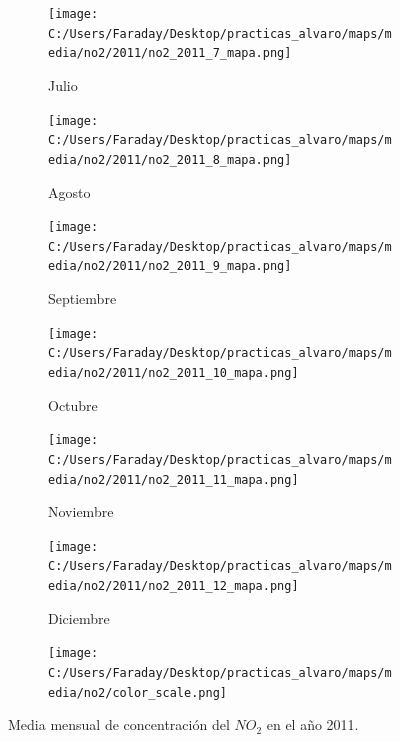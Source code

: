 \documentclass[12pt]{article}
\begin{document}
\begin{figure}[H]
\begin{subfigure}[H]{0.15\textwidth}
\texttt{[image: C:/Users/Faraday/Desktop/practicas\_alvaro/maps/media/no2/2011/no2\_2011\_7\_mapa.png]}
\captionsetup{labelformat=empty}
\caption{Julio}
\label{fig:map-no2-2011-7}
\end{subfigure}
%
\begin{subfigure}[H]{0.15\textwidth}
\texttt{[image: C:/Users/Faraday/Desktop/practicas\_alvaro/maps/media/no2/2011/no2\_2011\_8\_mapa.png]}
\captionsetup{labelformat=empty}
\caption{Agosto}
\label{fig:map-no2-2011-8}
\end{subfigure}
%
\begin{subfigure}[H]{0.15\textwidth}
\texttt{[image: C:/Users/Faraday/Desktop/practicas\_alvaro/maps/media/no2/2011/no2\_2011\_9\_mapa.png]}
\captionsetup{labelformat=empty}
\caption{Septiembre}
\label{fig:map-no2-2011-9}
\end{subfigure}
%
\begin{subfigure}[H]{0.15\textwidth}
\texttt{[image: C:/Users/Faraday/Desktop/practicas\_alvaro/maps/media/no2/2011/no2\_2011\_10\_mapa.png]}
\captionsetup{labelformat=empty}
\caption{Octubre}
\label{fig:map-no2-2011-10}
\end{subfigure}
%
\begin{subfigure}[H]{0.15\textwidth}
\texttt{[image: C:/Users/Faraday/Desktop/practicas\_alvaro/maps/media/no2/2011/no2\_2011\_11\_mapa.png]}
\captionsetup{labelformat=empty}
\caption{Noviembre}
\label{fig:map-no2-2011-11}
\end{subfigure}
%
\begin{subfigure}[H]{0.15\textwidth}
\texttt{[image: C:/Users/Faraday/Desktop/practicas\_alvaro/maps/media/no2/2011/no2\_2011\_12\_mapa.png]}
\captionsetup{labelformat=empty}
\caption{Diciembre}
\label{fig:map-no2-2011-12}
\end{subfigure}

\begin{subfigure}[H]{0.45\textwidth}
\texttt{[image: C:/Users/Faraday/Desktop/practicas\_alvaro/maps/media/no2/color\_scale.png]}
\captionsetup{labelformat=empty}
\caption{}
\end{subfigure}

\vspace*{-7mm}
\caption{Media mensual de concentración del $NO_{2}$ en el año 2011.}
\label{fig:map-no2-2011}
\end{figure}
\end{document}
